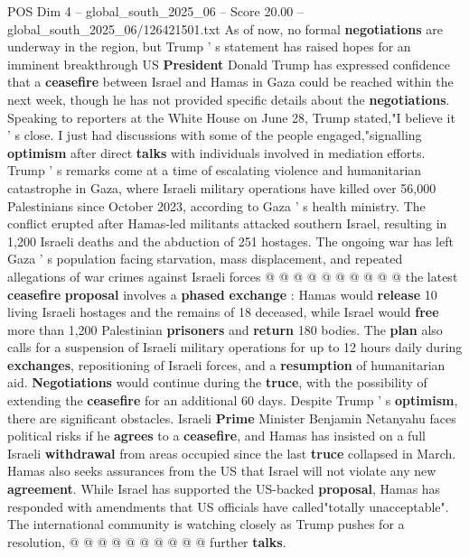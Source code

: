 \begin{textsample}{POS Dim 4 – global\_south\_2025\_06 – Score 20.00 – global\_south\_2025\_06/126421501.txt}  \label{ex:f4_pos_353}
As of now, no formal \textbf{negotiations} are underway in the region, but Trump ' s statement has raised hopes for an imminent breakthrough US \textbf{President} Donald Trump has expressed confidence that a \textbf{ceasefire} between Israel and Hamas in Gaza could be reached within the next week, though he has not provided specific details about the \textbf{negotiations}.
Speaking to reporters at the White House on June 28, Trump stated,"I believe it ' s close.
I just had discussions with some of the people engaged,"signalling \textbf{optimism} after direct \textbf{talks} with individuals involved in mediation efforts.
Trump ' s remarks come at a time of escalating violence and humanitarian catastrophe in Gaza, where Israeli military operations have killed over 56,000 Palestinians since October 2023, according to Gaza ' s health ministry.
The conflict erupted after Hamas-led militants attacked southern Israel, resulting in 1,200 Israeli deaths and the abduction of 251 hostages.
The ongoing war has left Gaza ' s population facing starvation, mass displacement, and repeated allegations of war crimes against Israeli forces @ @ @ @ @ @ @ @ @ @ the latest \textbf{ceasefire} \textbf{proposal} involves a \textbf{phased} \textbf{exchange} : Hamas would \textbf{release} 10 living Israeli hostages and the remains of 18 deceased, while Israel would \textbf{free} more than 1,200 Palestinian \textbf{prisoners} and \textbf{return} 180 bodies.
The \textbf{plan} also calls for a suspension of Israeli military operations for up to 12 hours daily during \textbf{exchanges}, repositioning of Israeli forces, and a \textbf{resumption} of humanitarian aid. \textbf{Negotiations} would continue during the \textbf{truce}, with the possibility of extending the \textbf{ceasefire} for an additional 60 days.
Despite Trump ' s \textbf{optimism}, there are significant obstacles.
Israeli \textbf{Prime} Minister Benjamin Netanyahu faces political risks if he \textbf{agrees} to a \textbf{ceasefire}, and Hamas has insisted on a full Israeli \textbf{withdrawal} from areas occupied since the last \textbf{truce} collapsed in March.
Hamas also seeks assurances from the US that Israel will not violate any new \textbf{agreement}.
While Israel has supported the US-backed \textbf{proposal}, Hamas has responded with amendments that US officials have called"totally unacceptable".
The international community is watching closely as Trump pushes for a resolution, @ @ @ @ @ @ @ @ @ @ further \textbf{talks}.

\end{textsample}
